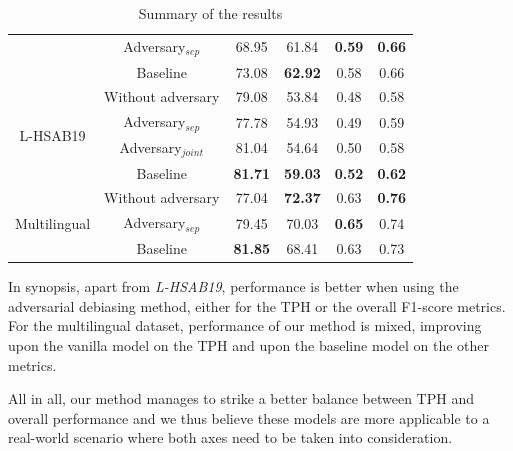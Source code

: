 \documentclass[11pt]{article}
\begin{document}
\begin{table}[t!]
\begin{threeparttable}
\begin{tabular}{|c|c|c|c|c|c|}
				\cline{2-6}
				~ & Adversary$_{sep}$ & 68.95 & 61.84 & \textbf{0.59} & \textbf{0.66} \\
				\cline{2-6}
				~ & Baseline & 73.08 & \textbf{62.92} & 0.58 & 0.66 \\
				\hline\hline
				\multirow{4}{*}{L-HSAB19} & Without adversary & 79.08 & 53.84 &0.48 & 0.58 \\
				\cline{2-6}
				~ & Adversary$_{sep}$ & 77.78 & 54.93 & 0.49 & 0.59  \\
				\cline{2-6}
				~ & Adversary$_{joint}$ & 81.04 & 54.64 & 0.50 & 0.58 \\
				\cline{2-6}
				~ & Baseline & \textbf{81.71} & \textbf{59.03} & \textbf{0.52} & \textbf{0.62} \\
				\hline\hline
				\multirow{4}{*}{Multilingual} & Without adversary & 77.04 & \textbf{72.37} & 0.63 & \textbf{0.76} \\
				\cline{2-6}
				~ & Adversary$_{sep}$ & 79.45 & 70.03 & \textbf{0.65} & 0.74 \\
				\cline{2-6}
				~ & Baseline & \textbf{81.85} & 68.41 & 0.63 & 0.73 \\
				\hline
			\end{tabular}
		\end{threeparttable}
		\caption{Summary of the results\label{all_result}}
	\end{table}
	
	In synopsis, apart from \textit{L-HSAB19}, performance is better when using the adversarial debiasing method, either for the TPH or the overall F1-score metrics. For the multilingual dataset, performance of our method is mixed, improving upon the vanilla model on the TPH and upon the baseline model on the other metrics.
	
	All in all, our method manages to strike a better balance between TPH and overall performance and we thus believe these models are more applicable to a real-world scenario where both axes need to be taken into consideration.
	
\end{document}
